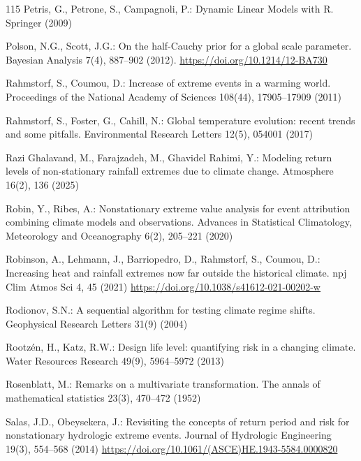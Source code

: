\documentclass[11pt,a4paper]{article}
\begin{document}
\begin{thebibliography}{115}
		Petris, G., Petrone, S., Campagnoli, P.: Dynamic Linear Models with R. Springer (2009)
		
Polson, N.G., Scott, J.G.: On the half-Cauchy prior for a global scale
parameter. Bayesian Analysis 7(4), 887--902 (2012).
\url{https://doi.org/10.1214/12-BA730}

		Rahmstorf, S., Coumou, D.: Increase of extreme events in a warming world. Proceedings of the National Academy of Sciences 108(44), 17905--17909 (2011)
		
		Rahmstorf, S., Foster, G., Cahill, N.: Global temperature evolution: recent trends and some pitfalls. Environmental Research Letters 12(5), 054001 (2017)
		
		Razi Ghalavand, M., Farajzadeh, M., Ghavidel Rahimi, Y.: Modeling return levels of non-stationary rainfall extremes due to climate change. Atmosphere 16(2), 136 (2025)
		
		Robin, Y., Ribes, A.: Nonstationary extreme value analysis for event attribution combining climate models and observations. Advances in Statistical Climatology, Meteorology and Oceanography 6(2), 205--221 (2020)
		
		Robinson, A., Lehmann, J., Barriopedro, D., Rahmstorf, S., Coumou, D.: Increasing heat and rainfall extremes now far outside the historical climate. npj Clim Atmos Sci 4, 45 (2021) \url{https://doi.org/10.1038/s41612-021-00202-w}
		
		Rodionov, S.N.: A sequential algorithm for testing climate regime shifts. Geophysical Research Letters 31(9) (2004)
		
		Rootzén, H., Katz, R.W.: Design life level: quantifying risk in a changing climate. Water Resources Research 49(9), 5964--5972 (2013)
		
		Rosenblatt, M.: Remarks on a multivariate transformation. The annals of mathematical statistics 23(3), 470--472 (1952)
		
		Salas, J.D., Obeysekera, J.: Revisiting the concepts of return period and risk for nonstationary hydrologic extreme events. Journal of Hydrologic Engineering 19(3), 554--568 (2014) \url{https://doi.org/10.1061/(ASCE)HE.1943-5584.0000820}
		

\end{thebibliography}
\end{document}
